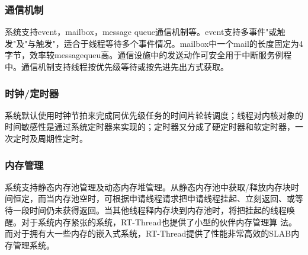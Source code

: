 \subsubsection{通信机制}
系{\cf}统支{\cf}持e{\cf}ve{\cf}nt{\cf}，m{\cf}ai{\cf}lb{\cf}ox{\cf}，m{\cf}es{\cf}sa{\cf}ge{\cf} q{\cf}ue{\cf}ue{\cf}通信{\cf}机制{\cf}等。{\cf}ev{\cf}en{\cf}t支{\cf}持多{\cf}事件{\cf}"或{\cf}触发{\cf}"及{\cf}"与{\cf}触发{\cf}"，{\cf}适合{\cf}于线{\cf}程等{\cf}待多{\cf}个事{\cf}件情{\cf}况。{\cf}ma{\cf}il{\cf}bo{\cf}x中{\cf}一个{\cf}ma{\cf}il{\cf}的长{\cf}度固{\cf}定为{\cf}4字{\cf}节，{\cf}效率{\cf}较m{\cf}es{\cf}sa{\cf}ge{\cf}qu{\cf}eu{\cf}高。{\cf}通信{\cf}设施{\cf}中的{\cf}发送{\cf}动作{\cf}可安{\cf}全用{\cf}于中{\cf}断服{\cf}务例{\cf}程中{\cf}。通{\cf}信机{\cf}制支{\cf}持线{\cf}程按{\cf}优先{\cf}级等{\cf}待或{\cf}按先{\cf}进先{\cf}出方{\cf}式获{\cf}取。

\subsubsection{时钟/定时器}
系{\cf}统默{\cf}认使{\cf}用时{\cf}钟节{\cf}拍来{\cf}完成{\cf}同优{\cf}先级{\cf}任务{\cf}的时{\cf}间片{\cf}轮转{\cf}调度{\cf}；线{\cf}程对{\cf}内核{\cf}对象{\cf}的时{\cf}间敏{\cf}感性{\cf}是通{\cf}过系{\cf}统定{\cf}时器{\cf}来实{\cf}现的{\cf}；定{\cf}时器{\cf}又分{\cf}成了{\cf}硬定{\cf}时器{\cf}和软{\cf}定时{\cf}器，{\cf}一 {\cf}次定{\cf}时及{\cf}周期{\cf}性定{\cf}时。

\subsubsection{内存管理}
系{\cf}统支{\cf}持静{\cf}态内{\cf}存池{\cf}管理{\cf}及动{\cf}态内{\cf}存堆{\cf}管理{\cf}。从{\cf}静态{\cf}内存{\cf}池中{\cf}获取{\cf}/释{\cf}放内{\cf}存块{\cf}时间{\cf}恒定{\cf}，而{\cf}当内{\cf}存池{\cf}空时{\cf}，可{\cf}根据{\cf}申请{\cf}线程{\cf}请求{\cf}把申{\cf}请线{\cf}程挂{\cf}起、{\cf}立刻{\cf}返回{\cf}、或{\cf}等 {\cf}待一{\cf}段时{\cf}间仍{\cf}未获{\cf}得返{\cf}回。{\cf}当其{\cf}他线{\cf}程释{\cf}内存{\cf}块到{\cf}内存{\cf}池时{\cf}，将{\cf}把挂{\cf}起的{\cf}线程{\cf}唤醒{\cf}。对{\cf}于系{\cf}统内{\cf}存紧{\cf}张的{\cf}系统{\cf}，R{\cf}T-{\cf}Th{\cf}re{\cf}ad{\cf}也提{\cf}供了{\cf}小型{\cf}的伙{\cf}伴内{\cf}存管{\cf}理算{\cf} 法{\cf}。而{\cf}对于{\cf}拥有{\cf}大一{\cf}些内{\cf}存的{\cf}嵌入{\cf}式系{\cf}统，{\cf}RT{\cf}-T{\cf}hr{\cf}ea{\cf}d提{\cf}供了{\cf}性能{\cf}非常{\cf}高效{\cf}的S{\cf}LA{\cf}B内{\cf}存管{\cf}理系{\cf}统。

